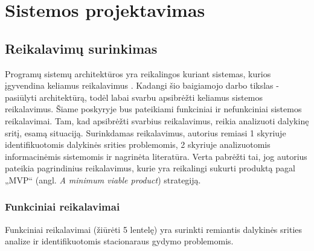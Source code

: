 

\section{Sistemos projektavimas}


\subsection{Reikalavimų surinkimas}
Programų sistemų architektūros yra reikalingos kuriant sistemas, kurios įgyvendina keliamus reikalavimus \cite{Bass2013}. Kadangi šio baigiamojo darbo tikslas - pasiūlyti architektūrą, todėl labai svarbu apsibrėžti keliamus sistemos reikalavimus. Šiame poskyryje bus pateikiami funkciniai ir nefunkciniai sistemos reikalavimai. Tam, kad apsibrėžti svarbius reikalavimus, reikia analizuoti dalykinę sritį, esamą situaciją. Surinkdamas reikalavimus, autorius remiasi 1 skyriuje identifikuotomis dalykinės srities problemomis, 2 skyriuje analizuotomis informacinėmis sistemomis ir nagrinėta literatūra. Verta pabrėžti tai, jog autorius pateikia pagrindinius reikalavimus, kurie yra reikalingi sukurti produktą pagal „MVP“ (angl. \textit{A minimum viable product}) strategiją.

\subsubsection{Funkciniai reikalavimai}

Funkciniai reikalavimai (žiūrėti 5 lentelę) yra surinkti remiantis dalykinės srities analize ir identifikuotomis stacionaraus gydymo problemomis.

